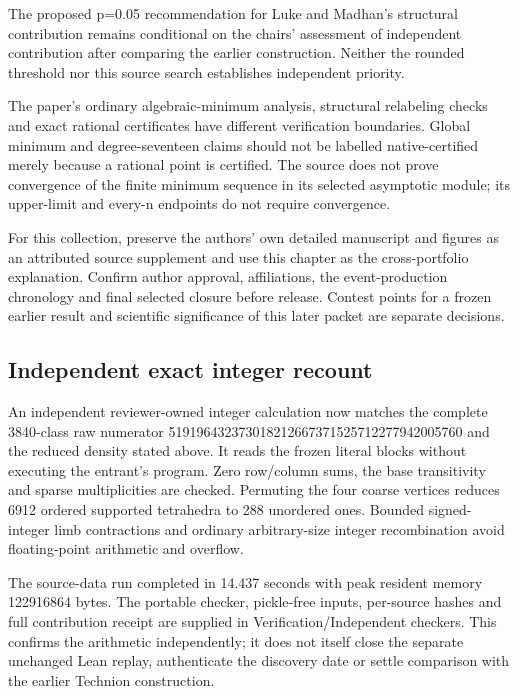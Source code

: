 \documentclass[11pt,a4paper]{article}
\begin{document}
\begin{samepage}
The proposed p=0.05 recommendation for Luke and Madhan's structural contribution remains conditional on the chairs' assessment of independent contribution after comparing the earlier construction. Neither the rounded threshold nor this source search establishes independent priority.

\end{samepage}
The paper's ordinary algebraic-minimum analysis, structural relabeling checks and exact rational certificates have different verification boundaries. Global minimum and degree-seventeen claims should not be labelled native-certified merely because a rational point is certified. The source does not prove convergence of the finite minimum sequence in its selected asymptotic module; its upper-limit and every-n endpoints do not require convergence.

For this collection, preserve the authors' own detailed manuscript and figures as an attributed source supplement and use this chapter as the cross-portfolio explanation. Confirm author approval, affiliations, the event-production chronology and final selected closure before release. Contest points for a frozen earlier result and scientific significance of this later packet are separate decisions.

\subsection{Independent exact integer recount}
An independent reviewer-owned integer calculation now matches the complete 3840-class raw numerator 519196432373018212667371525712277942005760 and the reduced density stated above. It reads the frozen literal blocks without executing the entrant's program. Zero row/column sums, the base transitivity and sparse multiplicities are checked. Permuting the four coarse vertices reduces 6912 ordered supported tetrahedra to 288 unordered ones. Bounded signed-integer limb contractions and ordinary arbitrary-size integer recombination avoid floating-point arithmetic and overflow.

The source-data run completed in 14.437 seconds with peak resident memory 122916864 bytes. The portable checker, pickle-free inputs, per-source hashes and full contribution receipt are supplied in Verification/Independent checkers. This confirms the arithmetic independently; it does not itself close the separate unchanged Lean replay, authenticate the discovery date or settle comparison with the earlier Technion construction.
\end{document}
